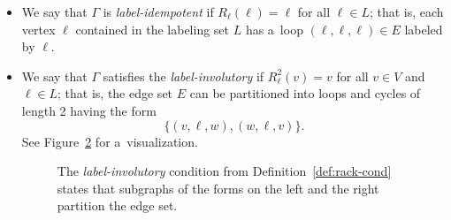 \documentclass{jonasart}
\begin{document}
\begin{definition}
\begin{itemize}
\begin{figure}
				\caption{The \emph{second rack condition} from Definition~\ref{def:rack-cond} states that for all subgraphs of the form on the left and non-label vertices $x\in V\setminus L$, if $R_\ell(x)\in L$ is a~label, then there exists a~subgraph of the form on the right.}
				\label{fig:rack-cond-2}
			\end{figure}
            
			\item We say that $\Gamma$ is \emph{label-idempotent} if $R_\ell(\ell)=\ell$ for all $\ell\in L$; that is, each vertex $\ell$ contained in the labeling set $L$ has a~loop $(\ell,\ell,\ell)\in E$ labeled by $\ell$.
			\item We say that $\Gamma$ satisfies the \emph{label-involutory} if $R^2_\ell(v)=v$ for all $v\in V$ and $\ell\in L$; that is, the edge set $E$ can be partitioned into loops and cycles of length 2 having the form
			\[
				\{(v,\ell,w),(w,\ell,v)\}.
			\]
			See Figure~\ref{fig:inv-cond} for a~visualization.
			\begin{figure}
				\centering
				\caption{The \emph{label-involutory} condition from Definition~\ref{def:rack-cond} states that subgraphs of the forms on the left and the right partition the edge set.}
				\label{fig:inv-cond}
			\end{figure}
		\end{itemize}
	\end{definition}
\end{document}
